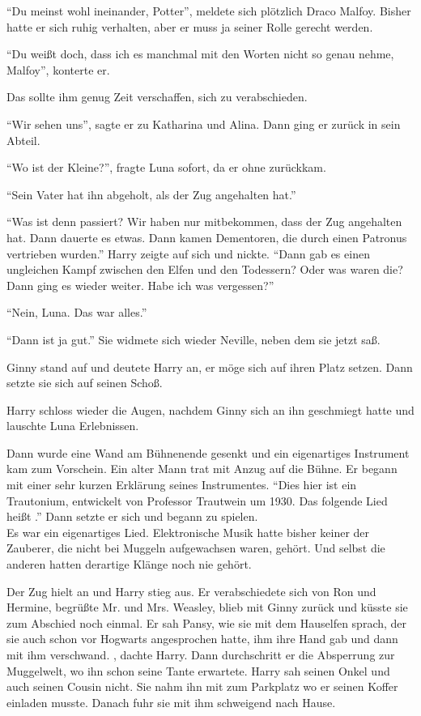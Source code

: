 \enquote{Du meinst wohl ineinander, Potter}, meldete sich plötzlich Draco Malfoy. Bisher hatte er sich ruhig verhalten, aber er muss ja seiner Rolle gerecht werden.

\enquote{Du weißt doch, dass ich es manchmal mit den Worten nicht so genau nehme, Malfoy}, konterte er.

Das sollte ihm genug Zeit verschaffen, sich zu verabschieden.

\enquote{Wir sehen uns}, sagte er zu Katharina und Alina. Dann ging er zurück in sein Abteil.

\enquote{Wo ist der Kleine?}, fragte Luna sofort, da er ohne zurückkam.

\enquote{Sein Vater hat ihn abgeholt, als der Zug angehalten hat.}

\enquote{Was ist denn passiert? Wir haben nur mitbekommen, dass der Zug angehalten hat. Dann dauerte es etwas. Dann kamen Dementoren, die durch einen Patronus vertrieben wurden.} Harry zeigte auf sich und nickte. \enquote{Dann gab es einen ungleichen Kampf zwischen den Elfen und den Todessern? Oder was waren die? Dann ging es wieder weiter. Habe ich was vergessen?}

\enquote{Nein, Luna. Das war alles.}

\enquote{Dann ist ja gut.} Sie widmete sich wieder Neville, neben dem sie jetzt saß.

Ginny stand auf und deutete Harry an, er möge sich auf ihren Platz setzen. Dann setzte sie sich auf seinen Schoß.

Harry schloss wieder die Augen, nachdem Ginny sich an ihn geschmiegt hatte und lauschte Luna Erlebnissen.

\begin{rueckblick}
Dann wurde eine Wand am Bühnenende gesenkt und ein eigenartiges Instrument kam zum Vorschein. Ein alter Mann trat mit Anzug auf die Bühne. Er begann mit einer sehr kurzen Erklärung seines Instrumentes. \enquote{Dies hier ist ein Trautonium, entwickelt von Professor Trautwein um 1930. Das folgende Lied heißt .} Dann setzte er sich und begann zu spielen.\\
Es war ein eigenartiges Lied. Elektronische Musik hatte bisher keiner der Zauberer, die nicht bei Muggeln aufgewachsen waren, gehört. Und selbst die anderen hatten derartige Klänge noch nie gehört.
\end{rueckblick}

Der Zug hielt an und Harry stieg aus. Er verabschiedete sich von Ron und Hermine, begrüßte Mr. und Mrs. Weasley, blieb mit Ginny zurück und küsste sie zum Abschied noch einmal. Er sah Pansy, wie sie mit dem Hauselfen sprach, der sie auch schon vor Hogwarts angesprochen hatte, ihm ihre Hand gab und dann mit ihm verschwand. , dachte Harry. Dann durchschritt er die Absperrung zur Muggelwelt, wo ihn schon seine Tante erwartete. Harry sah seinen Onkel und auch seinen Cousin nicht. Sie nahm ihn mit zum Parkplatz wo er seinen Koffer einladen musste. Danach fuhr sie mit ihm schweigend nach Hause.

